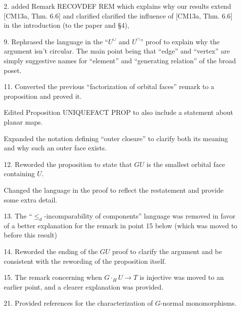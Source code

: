 \documentclass{article}
\begin{document}
\begin{itemize}
\item[2.] 
added Remark RECOVDEF REM which explains why our results extend [CM13a, Thm. 6.6] and clarified clarified the influence of [CM13a, Thm. 6.6] in the introduction (to the paper and \S 4), 

\item[9.] Rephrased the language in the ``$U^{\cup}$ and $U^{\cap}$'' proof to explain why the argument isn't circular. The main point being that ``edge'' and ``vertex'' are simply suggestive names for ``element'' and ``generating relation'' of the broad poset.


\item[11.] Converted the previous ``factorization of orbital faces'' remark to a proposition and proved it.

Edited Proposition UNIQUEFACT PROP to also include a statement about planar maps.

Expanded the notation defining ``outer closure'' to clarify both its meaning and why such an outer face exists.


\item[12.] Reworded the proposition to state that $GU$ is the smallest orbital face containing $U$.

Changed the language in the proof to reflect the restatement and provide some extra detail.


\item[13.] The ``$\leq_d$-incomparability of components'' language was removed in favor of a better explanation for the remark in point 15 below (which was moved to before this result)


\item[14.] Reworded the ending of the $GU$ proof to clarify the argument and be consistent with the rewording of the proposition itself.

\item[15.] The remark concerning when $G\cdot_H U \to T$ is injective was moved to an earlier point, and a clearer explanation was provided.

\item[21.] Provided references for the characterization of $G$-normal monomorphisms.
 

\end{itemize}
\end{document}
